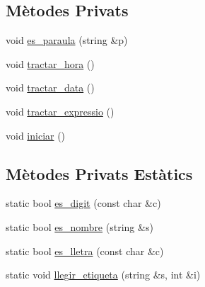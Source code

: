 \subsection*{Mètodes Privats}
\begin{DoxyCompactItemize}
\item 
void \hyperlink{class_token_a8b4b59b918158b7eb767e5f78730bb3f}{es\+\_\+paraula} (string \&p)
\item 
void \hyperlink{class_token_a37eb2cacee3a373bff5794e0eeffe7b4}{tractar\+\_\+hora} ()
\item 
void \hyperlink{class_token_a6caad8c345876742de8ee08fc9a13910}{tractar\+\_\+data} ()
\item 
void \hyperlink{class_token_abcc042ca3e95feefac091792ee526fc2}{tractar\+\_\+expressio} ()
\item 
void \hyperlink{class_token_a8115f6d5917bd05f7cd568622318af24}{iniciar} ()
\end{DoxyCompactItemize}
\subsection*{Mètodes Privats Estàtics}
\begin{DoxyCompactItemize}
\item 
static bool \hyperlink{class_token_a128f20b69704c51c86490a96c3d49084}{es\+\_\+digit} (const char \&c)
\item 
static bool \hyperlink{class_token_a93569340aa393358e31205fbb57f7978}{es\+\_\+nombre} (string \&s)
\item 
static bool \hyperlink{class_token_a29e03315052975e392b62f78f026fb41}{es\+\_\+lletra} (const char \&c)
\item 
static void \hyperlink{class_token_a4910b5b17b9398996a51a8ad9193420c}{llegir\+\_\+etiqueta} (string \&s, int \&i)
\end{DoxyCompactItemize}
